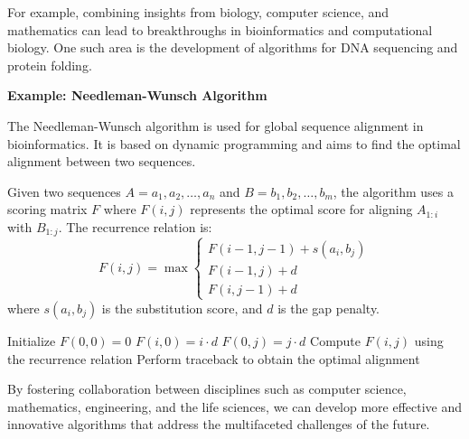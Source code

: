\documentclass[12pt]{book} %
\begin{document}
For example, combining insights from biology, computer science, and mathematics can lead to breakthroughs in bioinformatics and computational biology. One such area is the development of algorithms for DNA sequencing and protein folding.

\textbf{Example: Needleman-Wunsch Algorithm}

The Needleman-Wunsch algorithm is used for global sequence alignment in bioinformatics. It is based on dynamic programming and aims to find the optimal alignment between two sequences.

Given two sequences \(A = a_1, a_2, \ldots, a_n\) and \(B = b_1, b_2, \ldots, b_m\), the algorithm uses a scoring matrix \(F\) where \(F(i, j)\) represents the optimal score for aligning \(A_{1:i}\) with \(B_{1:j}\). The recurrence relation is:
\[
F(i, j) = \max
\begin{cases}
F(i-1, j-1) + s(a_i, b_j) \\
F(i-1, j) + d \\
F(i, j-1) + d
\end{cases}
\]
where \(s(a_i, b_j)\) is the substitution score, and \(d\) is the gap penalty.
\FloatBarrier
\begin{algorithm}
\caption{Needleman-Wunsch Algorithm}
\begin{algorithmic}[1]
\State Initialize \(F(0, 0) = 0\)
    \State \(F(i, 0) = i \cdot d\)
\EndFor
{}
    \State \(F(0, j) = j \cdot d\)
\EndFor
{}
    \State Compute \(F(i, j)\) using the recurrence relation
\EndFor
\State Perform traceback to obtain the optimal alignment
\end{algorithmic}
\end{algorithm}
\FloatBarrier
By fostering collaboration between disciplines such as computer science, mathematics, engineering, and the life sciences, we can develop more effective and innovative algorithms that address the multifaceted challenges of the future.
\end{document}
